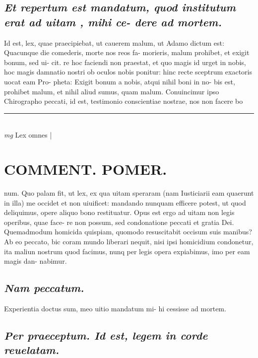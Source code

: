 \documentclass{article}
\begin{document}
\begin{pages}
\subsection*{\textit{Et repertum est mandatum, quod institutum erat ad uitam , mihi ce- dere ad mortem. }}\pstart Id est, lex, quae praecipiebat, ut cauerem malum, ut Adamo dictum est: Quacunque die comederis, morte nos reos fa- morieris, malum prohibet, et exigit bonum, sed ui- cit.  re hoc faciendi non praestat, et quo magis id urget in nobis, hoc magis damnatio nostri ob oculos nobis ponitur: hinc recte sceptrum exactoris uocat eam Pro- pheta: Exigit bonum a nobis, atqui nihil boni in no- bis est, prohibet malum, et nihil aliud sumus, quam malum. Conuincimur ipso Chirographo peccati, id est, testimonio conscientiae nostrae, nos non facere bo  \pend\pstart  \pend
\vspace{0.5cm}\noindent
\vspace{0.2cm}\rule{1cm}{0.2pt}\\ 
\hspace{0.2cm}\textit{mg}
\footnotesize Lex omnes 
\normalsize| 
\section*{COMMENT. POMER.  }\pstart num. Quo palam fit, ut lex, ex qua uitam speraram (nam Iusticiarii eam quaerunt in illa) me occidet et non uiuificet: mandando nunquam efficere potest, ut quod deliquimus, opere aliquo bono restituatur.  Opus est ergo ad uitam non legis operibus, quae face- re non possum, sed condonatione peccati et gratia Dei. Quemadmodum homicida quispiam, quomodo resuscitabit occisum suis manibus? Ab eo peccato, bic coram mundo liberari nequit, nisi ipsi homicidium condonetur, ita maliun nostrum quod facimus, nunq per legis opera expiabimus, imo per eam magis dan- nabimur.   \pend
{}
{}
\subsection*{\textit{Nam peccatum. }}\pstart Experientia doctus sum, meo uitio mandatum mi- hi cessisse ad mortem.   \pend
{}
{}
\subsection*{\textit{Per praeceptum. Id est, legem in corde reuelatam.  }}
{}

\end{pages}
\end{document}
